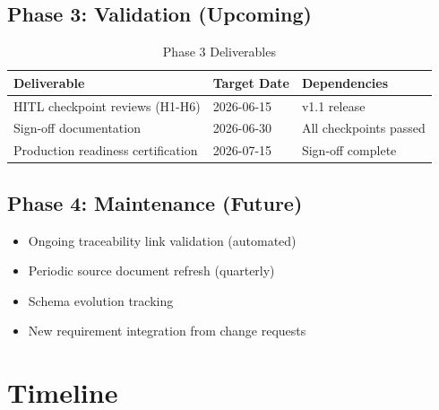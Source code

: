 \subsection{Phase 3: Validation (Upcoming)}

\begin{table}[h]
\centering
\caption{Phase 3 Deliverables}
\label{tab:phase3-deliverables}
\begin{tabularx}{\textwidth}{@{}L{5cm}C{2.5cm}L{6cm}@{}}
\toprule
\textbf{Deliverable} & \textbf{Target Date} & \textbf{Dependencies} \\
\midrule
HITL checkpoint reviews (H1-H6) & 2026-06-15 & v1.1 release \\
Sign-off documentation & 2026-06-30 & All checkpoints passed \\
Production readiness certification & 2026-07-15 & Sign-off complete \\
\bottomrule
\end{tabularx}
\end{table}

\subsection{Phase 4: Maintenance (Future)}

\begin{itemize}[noitemsep]
  \item Ongoing traceability link validation (automated)
  \item Periodic source document refresh (quarterly)
  \item Schema evolution tracking
  \item New requirement integration from change requests
\end{itemize}

\section{Timeline}
\label{sec:timeline}

